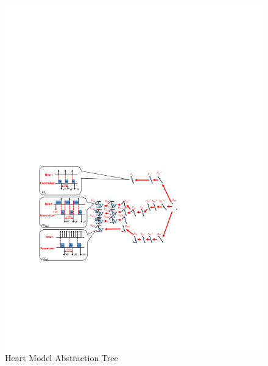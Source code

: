 \begin{figure}[!t]
	\centering
	\includegraphics[width=1.05\textwidth]{figs/abs_rev.pdf}
	\caption{\small Heart Model Abstraction Tree}
	\label{fig:abs_rev}
\end{figure}


